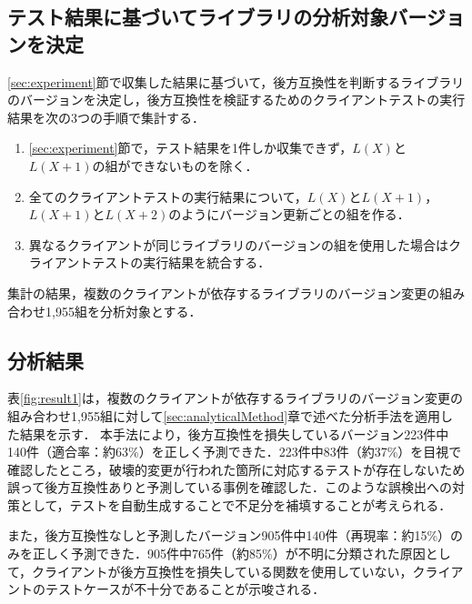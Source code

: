 \documentclass[submit]{ipsj}
\begin{document}
\subsection{テスト結果に基づいてライブラリの分析対象バージョンを決定}

\ref{sec:experiment}節で収集した結果に基づいて，後方互換性を判断するライブラリのバージョンを決定し，後方互換性を検証するためのクライアントテストの実行結果を次の3つの手順で集計する．
\begin{enumerate}
  \item \ref{sec:experiment}節で，テスト結果を1件しか収集できず，$L(X)$と$L(X+1)$の組ができないものを除く．
  \item 全てのクライアントテストの実行結果について，$L(X)$と$L(X+1)$，$L(X+1)$と$L(X+2)$のようにバージョン更新ごとの組を作る．
  \item 異なるクライアントが同じライブラリのバージョンの組を使用した場合はクライアントテストの実行結果を統合する．
\end{enumerate}
集計の結果，複数のクライアントが依存するライブラリのバージョン変更の組み合わせ1,955組を分析対象とする．

\subsection{分析結果}


表\ref{fig:result1}は，複数のクライアントが依存するライブラリのバージョン変更の組み合わせ1,955組に対して\ref{sec:analyticalMethod}章で述べた分析手法を適用した結果を示す．
本手法により，後方互換性を損失しているバージョン223件中140件（適合率：約63\%）を正しく予測できた．223件中83件（約37\%）を目視で確認したところ，破壊的変更が行われた箇所に対応するテストが存在しないため誤って後方互換性ありと予測している事例を確認した．このような誤検出への対策として，テストを自動生成することで不足分を補填することが考えられる．

また，後方互換性なしと予測したバージョン905件中140件（再現率：約15\%）のみを正しく予測できた．905件中765件（約85\%）が不明に分類された原因として，クライアントが後方互換性を損失している関数を使用していない，クライアントのテストケースが不十分であることが示唆される．
\end{document}
